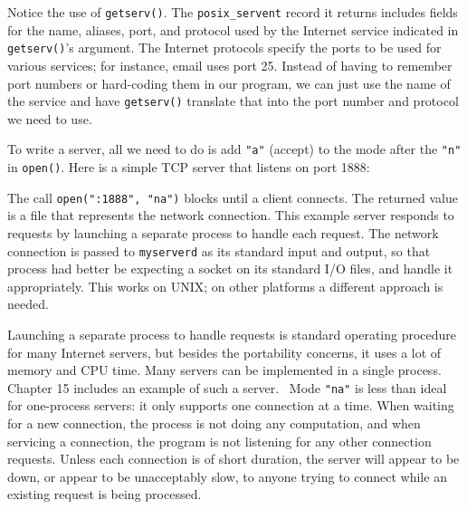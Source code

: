 Notice the use of \texttt{getserv()}. The
\texttt{posix\_servent} record it returns includes fields for the name,
aliases, port, and protocol used by the Internet service indicated in
\texttt{getserv()}'s argument. The Internet protocols
specify the ports to be used for various services; for instance, email
uses port 25. Instead of having to remember port numbers or hard-coding
them in our program, we can just use the name of the service and have
\texttt{getserv()} translate that into the port number and protocol we
need to use.

To write a server, all we need to do is add
\texttt{"a"} (accept) to the mode after the
\texttt{"n"} in \texttt{open()}. Here is a
simple TCP server that listens on port 1888:


The call \texttt{open(":1888",
"na")} blocks until a client connects.
The returned value is a file that represents the network connection.
This example server
responds to requests by launching a separate process to handle each
request. The network connection is passed to \texttt{myserverd} as its
standard input and output, so that process had better be expecting a
socket on its standard I/O files, and handle it appropriately.
This works on UNIX; on other platforms a different approach is needed.

Launching a separate process to handle requests is standard operating
procedure for many Internet servers, but besides the portability
concerns, it uses a lot of memory and CPU time. Many servers can be
implemented in a single process. Chapter 15 includes an example of such
a server. \ Mode \texttt{"na"} is less than
ideal for one-process servers: it only supports one connection at a
time. When waiting for a new connection, the process is not doing any
computation, and when servicing a connection, the program is not
listening for any other connection requests. Unless each connection is
of short duration, the server will appear to be down, or appear to be
unacceptably slow, to anyone trying to connect while an existing
request is being processed.

